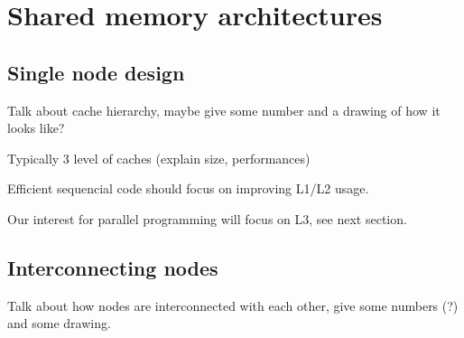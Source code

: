 \section{Shared memory architectures}\label{sec:context:numa}



\subsection{Single node design}

Talk about cache hierarchy, maybe give some number and a drawing of how it looks like?

Typically 3 level of caches (explain size, performances)

Efficient sequencial code should focus on improving L1/L2 usage.

Our interest for parallel programming will focus on L3, see next section.

\subsection{Interconnecting nodes}

Talk about how nodes are interconnected with each other, give some numbers (?) and some drawing.
